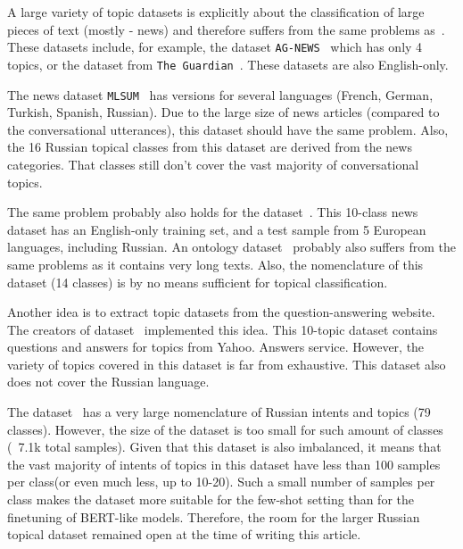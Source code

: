 A large variety of topic datasets is explicitly about the classification of large pieces of text (mostly - news) and therefore suffers from the same problems as~\cite{dp_topics}. 
These datasets include, for example, the dataset \texttt{AG-NEWS}~\cite{ag_news} which has only 4 topics, or the dataset from \texttt{The Guardian}~\cite{guardian_authorship}. These datasets are also English-only. 

The news dataset \texttt{MLSUM}~\cite{mlsum} has versions for several languages (French, German, Turkish, Spanish, Russian). Due to the large size of news articles (compared to the conversational utterances), this dataset should have the same problem. Also, the 16 Russian topical classes from this dataset are derived from the news categories. That classes still don't cover the vast majority of conversational topics. 

The same problem probably also holds for the dataset~\cite{xglue}. This 10-class news dataset has an English-only training set, and a test sample from 5 European languages, including Russian. 
An ontology dataset~\cite{dbpedia} probably also suffers from the same problems as it contains very long texts. Also, the nomenclature of this dataset (14 classes) is by no means sufficient for topical classification. 

Another idea is to extract topic datasets from the question-answering website. The creators of dataset~\cite{yahoo_answers_topics} implemented this idea. This 10-topic dataset contains questions and answers for topics from Yahoo. Answers service. However, the variety of topics covered in this dataset is far from exhaustive. This dataset also does not cover the Russian language. 

The dataset~\cite{chatbotru} has a very large nomenclature of Russian intents and topics (79 classes). However, the size of the dataset is too small for such amount of classes (~7.1k total samples). Given that this dataset is also imbalanced, it means that the vast majority of intents of topics in this dataset have less than 100 samples per class(or even much less, up to 10-20). Such a small number of samples per class makes the dataset more suitable for the few-shot setting than for the finetuning of BERT-like models. Therefore, the room for the larger Russian topical dataset remained open at the time of writing this article. 


